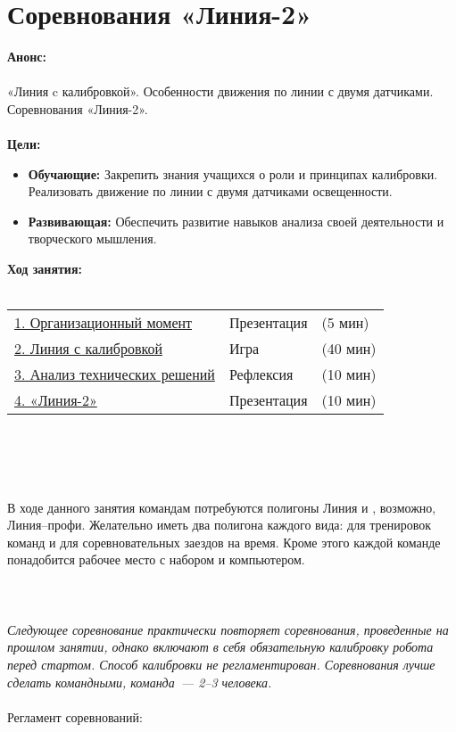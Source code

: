 \chapter{\label{lesson17}Соревнования «Линия-2»}
{\bfseries Анонс:}\\\\
«Линия c калибровкой». Особенности движения по линии с двумя датчиками. Соревнования «Линия-2».\\\\
{\bfseries Цели:}
\begin{itemize}
	\item{}{\bfseries Обучающие:} Закрепить знания учащихся о роли и принципах калибровки. Реализовать движение по линии с двумя датчиками освещенности.
	\item{}{\bfseries Развивающая:} Обеспечить развитие навыков анализа своей деятельности и творческого мышления.\\
\end{itemize}	
{\bfseries Ход занятия:}\\\\
\begin{tabular}[h!]{lll}
	{\hyperlink{lesson17x1}{1. Организационный момент}}&{Презентация}&{(5 мин)}\\
	{\hyperlink{lesson17x2}{2. Линия с калибровкой}}&{Игра}&{(40 мин)}\\
	{\hyperlink{lesson17x3}{3. Анализ технических решений}}&{Рефлексия}&{(10 мин)}\\
	{\hyperlink{lesson17x4}{4. «Линия-2»}}&{Презентация}&{(10 мин)}\\
\end{tabular}\\\\

{\hypertarget{lesson17x1}{}}\\\\	

В ходе данного занятия командам потребуются полигоны Линия и , возможно, Линия–профи. Желательно иметь два полигона каждого вида: для тренировок команд и для соревновательных заездов на время. Кроме этого каждой команде понадобится рабочее место с набором и компьютером.\\\\
\clearpage
{\hypertarget{lesson17x2}{}}\\\\

{\slshape Следующее соревнование практически повторяет соревнования, проведенные на прошлом занятии, однако включают в себя обязательную калибровку робота перед стартом. Способ калибровки не регламентирован. Соревнования лучше сделать командными, команда~--- 2--3 человека.}\\\\
Регламент соревнований:

